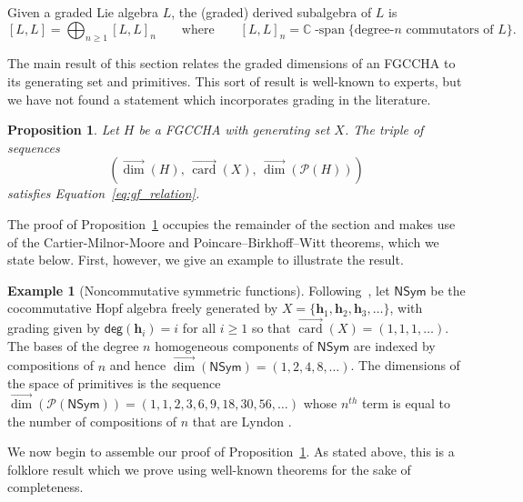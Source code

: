 \documentclass[11pt]{amsart}
\newtheorem{proposition}[theorem]{Proposition}
\theoremstyle{definition}
\newtheorem{example}[theorem]{Example}
\numberwithin{equation}{section}
\def\CC{{\mathbb C}}
\newcommand{\FGCCHA}{\textsf{FGCCHA}\xspace}
\newcommand{\vecdim}{\overrightarrow{\dim}}
\newcommand{\veccard}{\overrightarrow{\operatorname{card}}}
\begin{document}
Given a graded Lie algebra $L$, the (graded) derived subalgebra of $L$ is 
\begin{equation}
\label{eq:derivedLiesubalgebra}
[L, L] = \bigoplus_{n \ge 1} [L, L]_{n}
\qquad\text{where}\qquad
[L, L]_{n} = \CC\operatorname{-span}\{\text{degree-$n$ commutators of $L$}\}.
\end{equation}

The main result of this section relates the graded dimensions of an \FGCCHA to its generating set and primitives.  
This sort of result is well-known to experts, but we have not found a statement which incorporates grading in the literature.  

\begin{proposition}
\label{prop:SequencesAsHopfStructures}
Let $H$ be a \FGCCHA with generating set $X$.  The triple of sequences
\[
\left(\vecdim(H), \,
\veccard(X),\,
\vecdim\left(\mathcal{P}(H)\right) \right)
\]
satisfies Equation~\eqref{eq:gf_relation}.
\end{proposition}

The proof of Proposition~\ref{prop:SequencesAsHopfStructures} occupies the remainder of the section and makes use of the Cartier-Milnor-Moore and Poincare--Birkhoff--Witt theorems, which we state below.  First, however,  we give an example to illustrate the result.  

\begin{example}[Noncommutative symmetric functions]
\label{ex:NSym}
Following~\cite{GKLLRT}, let $\mathsf{NSym}$ \cite{GKLLRT} be the cocommutative Hopf algebra freely generated by $X = \{ \mathbf{h}_1, \mathbf{h}_2, \mathbf{h}_3, \ldots \}$, with grading given by $\mathsf{deg}(\mathbf{h}_{i}) = i$ for all $i \ge 1$ so that $\veccard(X) = (1, 1, 1, \ldots)$.  
The bases of the degree $n$ homogeneous components of $\mathsf{NSym}$ are indexed by compositions
of $n$ and hence $\vecdim(\mathsf{NSym}) = (1,2,4,8,\ldots)$.
The dimensions of the space of primitives is the sequence 
$\vecdim(\mathcal{P}(\mathsf{NSym})) = (1, 1, 2, 3, 6, 9, 18, 30, 56, \ldots)$
whose $n^{th}$ term is equal to the number
of compositions of $n$ that are Lyndon \cite{H07}.
\end{example}

We now begin to assemble our proof of Proposition~\ref{prop:SequencesAsHopfStructures}.  
As stated above, this is a folklore result which we prove using well-known theorems for the sake of completeness.  
\end{document}

